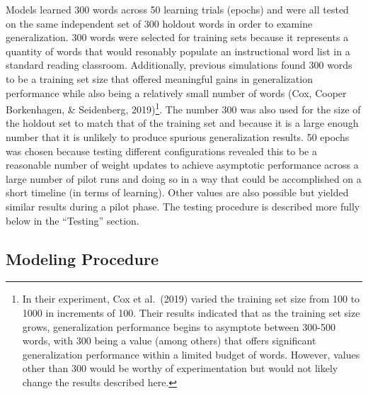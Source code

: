 \documentclass[
  ,man,floatsintext]{apa6}
\begin{document}
Models learned 300 words across 50 learning trials (epochs) and were all tested on the same independent set of 300 holdout words in order to examine generalization. 300 words were selected for training sets because it represents a quantity of words that would resonably populate an instructional word list in a standard reading classroom. Additionally, previous simulations found 300 words to be a training set size that offered meaningful gains in generalization performance while also being a relatively small number of words (Cox, Cooper Borkenhagen, \& Seidenberg, 2019)\footnote{In their experiment, Cox et al.~(2019) varied the training set size from 100 to 1000 in increments of 100. Their results indicated that as the training set size grows, generalization performance begins to asymptote between 300-500 words, with 300 being a value (among others) that offers significant generalization performance within a limited budget of words. However, values other than 300 would be worthy of experimentation but would not likely change the results described here.}. The number 300 was also used for the size of the holdout set to match that of the training set and because it is a large enough number that it is unlikely to produce spurious generalization results. 50 epochs was chosen because testing different configurations revealed this to be a reasonable number of weight updates to achieve asymptotic performance across a large number of pilot runs and doing so in a way that could be accomplished on a short timeline (in terms of learning). Other values are also possible but yielded similar results during a pilot phase. The testing procedure is described more fully below in the ``Testing'' section.

\subsection{Modeling Procedure}\label{modeling-procedure}
\end{document}
